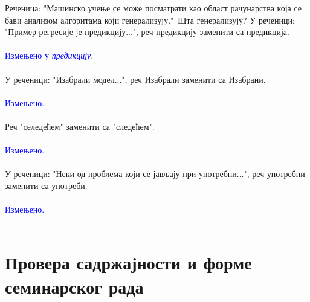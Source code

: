 \documentclass[a4paper]{report}
\newcommand{\odgovor}[1]{\textcolor{blue}{#1}}
\begin{document}
Реченица: "Машинско учење се може посматрати као област рачунарства која се бави анализом алгоритама који генерализују."\ Шта генерализују?
У реченици: "Пример регресије је предикцију...", реч предикцију заменити са предикција.
    \\\\
    \odgovor{Измењено у \emph{предикцију}.} 
	\\\\
У реченици: "Изабрали модел...", реч Изабрали заменити са Изабрани.
    \\\\
    \odgovor{Измењено.} 
	\\\\
Реч "селедећем" заменити са "следећем".
    \\\\
    \odgovor{Измењено.} 
	\\\\
У реченици: "Неки од проблема који се јављају при употребни...", реч употребни заменити са употреби.
    \\\\
    \odgovor{Измењено.} 
	\\\\
\section{Провера садржајности и форме семинарског рада}
\end{document}
